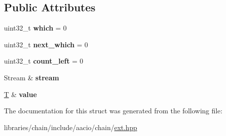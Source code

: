 \subsection*{Public Attributes}
\begin{DoxyCompactItemize}
\item 
\mbox{\label{structaacio_1_1chain_1_1aac__extension__unpack__visitor_a948dd3c5c3dbf5ccb6cef534aff7bd0c}} 
uint32\+\_\+t {\bfseries which} = 0
\item 
\mbox{\label{structaacio_1_1chain_1_1aac__extension__unpack__visitor_af0010433f623505af873a5daf55b455d}} 
uint32\+\_\+t {\bfseries next\+\_\+which} = 0
\item 
\mbox{\label{structaacio_1_1chain_1_1aac__extension__unpack__visitor_aced82cc418d974c9c4e57b760456064d}} 
uint32\+\_\+t {\bfseries count\+\_\+left} = 0
\item 
\mbox{\label{structaacio_1_1chain_1_1aac__extension__unpack__visitor_aeb04ec74ff22e438ce0ae2575151d4b9}} 
Stream \& {\bfseries stream}
\item 
\mbox{\label{structaacio_1_1chain_1_1aac__extension__unpack__visitor_a2c7e9e8400a12aabd6a89d3a36823fb8}} 
\mbox{\hyperlink{struct_t}{T}} \& {\bfseries value}
\end{DoxyCompactItemize}


The documentation for this struct was generated from the following file\+:\begin{DoxyCompactItemize}
\item 
libraries/chain/include/aacio/chain/\mbox{\hyperlink{ext_8hpp}{ext.\+hpp}}\end{DoxyCompactItemize}
